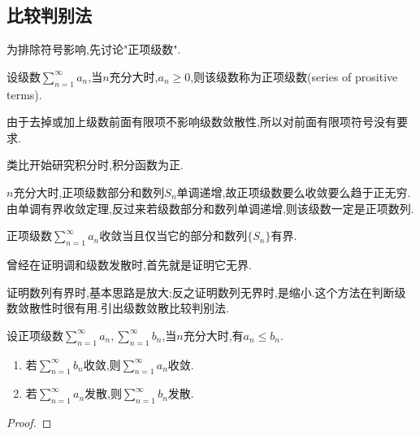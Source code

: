 \subsection{比较判别法}

为排除符号影响,先讨论"正项级数".

\begin{definition}[正项级数]
    设级数$\sum_{n=1}^\infty a_n$,当$n$充分大时,$a_n\geqslant 0$,则该级数称为正项级数(series of prositive terms).
\end{definition}

\begin{remark}
    由于去掉或加上级数前面有限项不影响级数敛散性,所以对前面有限项符号没有要求.
\end{remark}

\begin{note}
    类比开始研究积分时,积分函数为正.
\end{note}

$n$充分大时,正项级数部分和数列$S_n$单调递增,故正项级数要么收敛要么趋于正无穷.由单调有界收敛定理,反过来若级数部分和数列单调递增,则该级数一定是正项数列.

\begin{proposition}[正项级数收敛的充要条件]
    正项级数$\sum_{n=1}^\infty a_n$收敛当且仅当它的部分和数列$\{S_n\}$有界.
\end{proposition}

曾经在证明调和级数发散时,首先就是证明它无界.

\begin{example}%
    
\end{example}

证明数列有界时,基本思路是放大;反之证明数列无界时,是缩小.这个方法在判断级数敛散性时很有用.引出级数敛散比较判别法.

\begin{theorem}[比较判别法]
    设正项级数$\sum_{n=1}^\infty a_n,\sum_{n=1}^\infty b_n$,当$n$充分大时,有$a_n\leqslant b_n$.
    \begin{enumerate}
        \item 若$\sum_{n=1}^\infty b_n$收敛,则$\sum_{n=1}^\infty a_n$收敛.
        \item 若$\sum_{n=1}^\infty a_n$发散,则$\sum_{n=1}^\infty b_n$发散.
    \end{enumerate}
\end{theorem}

\begin{proof}%
    
\end{proof}

